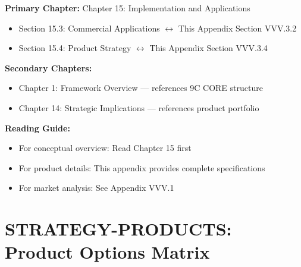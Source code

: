 \begin{tcolorbox}[colback=purple!5!white, colframe=purple!75!black,
    title=Chapter Linkage]

\textbf{Primary Chapter:} Chapter 15: Implementation and Applications
\begin{itemize}[nosep]
\item Section 15.3: Commercial Applications $\leftrightarrow$ This Appendix Section VVV.3.2
\item Section 15.4: Product Strategy $\leftrightarrow$ This Appendix Section VVV.3.4
\end{itemize}

\textbf{Secondary Chapters:}
\begin{itemize}[nosep]
\item Chapter 1: Framework Overview --- references 9C CORE structure
\item Chapter 14: Strategic Implications --- references product portfolio
\end{itemize}

\textbf{Reading Guide:}
\begin{itemize}[nosep]
\item For conceptual overview: Read Chapter 15 first
\item For product details: This appendix provides complete specifications
\item For market analysis: See Appendix VVV.1
\end{itemize}

\end{tcolorbox}


\chapter{STRATEGY-PRODUCTS: Product Options Matrix}
\label{app:vvv3-products}


\begin{abstract}
This appendix translates the 9C CORE framework into seven distinct product opportunities. Each CORE component (WHO, WHAT, HOW, WHEN, WHERE, AWARE, READY) maps to a specific product category with defined capabilities, use cases, and revenue models. The mapping provides a strategic blueprint for commercializing EBF, demonstrating how theoretical constructs become practical tools for stakeholder analysis, wellbeing assessment, complementarity optimization, context detection, calibration, awareness measurement, and intervention design.
\end{abstract}

